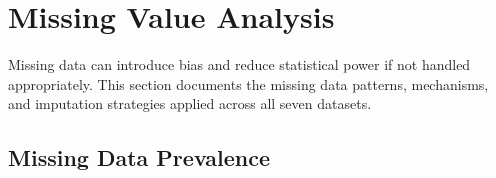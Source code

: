 \section{Missing Value Analysis}
\label{app:missing_values}

Missing data can introduce bias and reduce statistical power if not handled appropriately. This section documents the missing data patterns, mechanisms, and imputation strategies applied across all seven datasets.

\subsection{Missing Data Prevalence}

